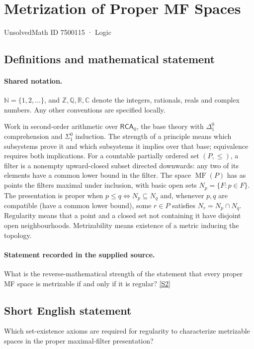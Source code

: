 \documentclass[11pt]{article}
\newcommand{\sref}[2]{\hyperlink{source:#1:#2}{[S#2]}}
\begin{document}
\setcounter{section}{7500114}
\section{Metrization of Proper MF Spaces}\label{7500115}
{\small\sffamily UnsolvedMath ID 7500115 · Logic}
\subsection{Definitions and mathematical statement}

\paragraph{Shared notation.}$\mathbb N=\{1,2,\ldots\}$, and $\mathbb Z,\mathbb Q,\mathbb R,\mathbb C$ denote the integers, rationals, reals and complex numbers. Any other conventions are specified locally.


Work in second-order arithmetic over $\mathsf{RCA}_0$, the base theory with $\Delta^0_1$ comprehension and $\Sigma^0_1$ induction. The strength of a principle means which subsystems prove it and which subsystems it implies over that base; equivalence requires both implications.  For a countable partially ordered set $(P,\leq)$, a filter is a nonempty upward-closed subset directed downwards: any two of its elements have a common lower bound in the filter. The space $\operatorname{MF}(P)$ has as points the filters maximal under inclusion, with basic open sets $N_p=\{F:p\in F\}$. The presentation is proper when $p\leq q\iff N_p\subseteq N_q$ and, whenever $p,q$ are compatible (have a common lower bound), some $r\in P$ satisfies $N_r=N_p\cap N_q$. Regularity means that a point and a closed set not containing it have disjoint open neighbourhoods. Metrizability means existence of a metric inducing the topology.
\paragraph{Statement recorded in the supplied source.}
What is the reverse-mathematical strength of the statement that every proper MF space is metrizable if and only if it is regular? \sref{7500115}{2}
\subsection{Short English statement}
Which set-existence axioms are required for regularity to characterize metrizable spaces in the proper maximal-filter presentation?
\end{document}
